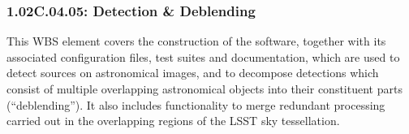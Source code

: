 \subsubsection*{1.02C.04.05: Detection \& Deblending}

This WBS element covers the construction of the software, together with its
associated configuration files, test suites and documentation, which are used
to detect sources on astronomical images, and to decompose detections which
consist of multiple overlapping astronomical objects into their constituent
parts (``deblending''). It also includes functionality to merge redundant
processing carried out in the overlapping regions of the LSST sky
tessellation.
